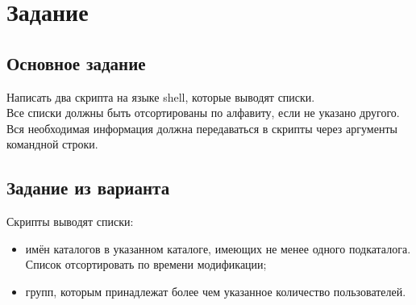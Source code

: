 \section{Задание}
\subsection{Основное задание}
Написать два скрипта на языке shell, которые выводят списки.\\

Все списки должны быть отсортированы по алфавиту, если не указано другого.\\

Вся необходимая информация должна передаваться в скрипты через аргументы командной строки. 
\subsection{Задание из варианта}
Скрипты выводят списки:
\begin{itemize}
    \item имён каталогов в указанном каталоге, имеющих не менее одного подкаталога. Список отсортировать по времени модификации;
    \item групп, которым принадлежат более чем указанное количество пользователей.
\end{itemize}

